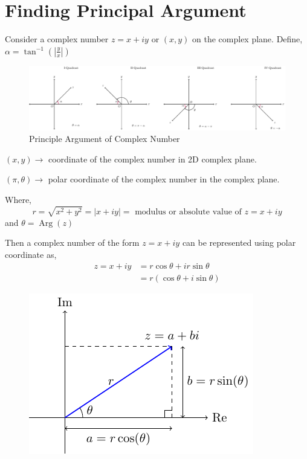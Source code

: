 \section{Finding Principal Argument}
Consider a complex number $z=x+i y$ or $(x, y)$ on the complex plane. Define, $\displaystyle\alpha=\tan ^{-1}\left(\left|\frac{y}{x}\right|\right)$
\begin{figure}[ht!]
    \centering
    \includegraphics[scale=0.5]{FIG_MAT215/FIG4.pdf}
    \caption{Principle Argument of Complex Number}
    \label{fig4}
\end{figure}
\FloatBarrier
\noindent $(x, y) \rightarrow$ coordinate of the complex number in 2D complex plane.\par 
\noindent $(\pi, \theta) \rightarrow$ polar coordinate of the complex number in the complex plane. \par 
\noindent Where,
$$
r=\sqrt{x^2+y^2}=|x+i y|=\text { modulus or absolute value of } z=x+i y
$$
and $\theta=\operatorname{Arg}(z)$\par 
\noindent Then a complex number of the form $z=x+i y$ can be represented using polar coordinate as,
$$
\begin{aligned}
z=x+i y & =r \cos \theta+i r \sin \theta \\
& =r(\cos \theta+i \sin \theta)
\end{aligned}
$$
\begin{figure}[ht!]
    \centering
    \includegraphics{FIG_MAT215/FIG5.pdf}
    \caption{}
    \label{fig5}
\end{figure}
